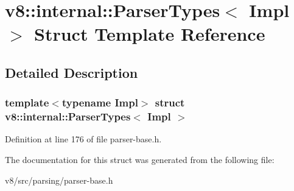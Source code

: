 \hypertarget{structv8_1_1internal_1_1ParserTypes}{}\section{v8\+:\+:internal\+:\+:Parser\+Types$<$ Impl $>$ Struct Template Reference}
\label{structv8_1_1internal_1_1ParserTypes}


\subsection{Detailed Description}
\subsubsection*{template$<$typename Impl$>$\newline
struct v8\+::internal\+::\+Parser\+Types$<$ Impl $>$}



Definition at line 176 of file parser-\/base.\+h.



The documentation for this struct was generated from the following file\+:\begin{DoxyCompactItemize}
\item 
v8/src/parsing/parser-\/base.\+h\end{DoxyCompactItemize}
